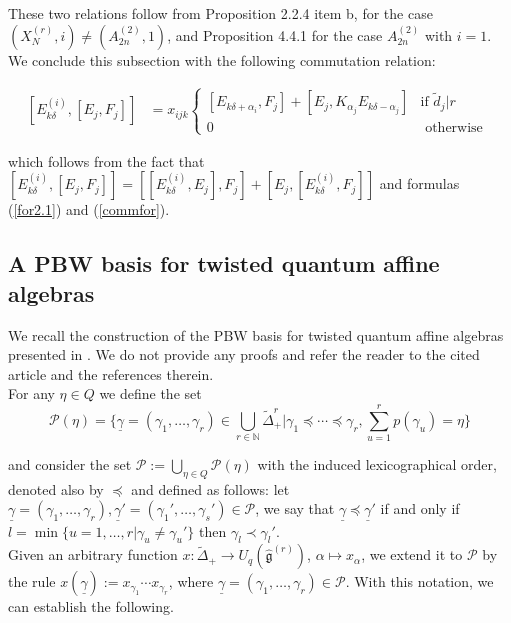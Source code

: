 \documentclass[12pt]{amsart}
\numberwithin{equation}{section}
\newcommand{\g}{\ensuremath{\mathfrak{g}}}
\newcommand{\mc}[1]{\mathcal{#1}}
\newcommand{\mb}[1]{\mathbb{#1}}
\begin{document}
These two relations follow from \cite{D} Proposition 2.2.4 item b, for the case $(X_N^{(r)}, i) \neq (A_{2n}^{(2)},1)$, and Proposition 4.4.1 for the case $A_{2n}^{(2)}$ with $i=1$. We conclude this subsection with the following commutation relation:

\begin{align}\label{for2.8}
    [E_{k\delta}^{(i)}, [E_j, F_j]] &=  x_{ijk}\begin{cases}
        [E_{k\delta + \alpha_i}, F_j] + [E_j, K_{\alpha_j}E_{k\delta-\alpha_j}] & \mbox{if } \tilde{d}_j|r\\
        0 & \mbox{ otherwise }
    \end{cases}
\end{align}

which follows from the fact that $[E_{k\delta}^{(i)}, [E_j, F_j]] = [[E_{k\delta}^{(i)}, E_j], F_j] + [E_j, [E_{k\delta}^{(i)}, F_j]]$ and formulas (\ref{for2.1}) and (\ref{commfor}).

\subsection{A PBW basis for twisted quantum affine algebras} 

We recall the construction of the PBW basis for twisted quantum affine algebras presented in \cite{D}. We do not provide any proofs and refer the reader to the cited article and the references therein.\\

For any $\eta \in Q$ we define the set 
$$\mc{P}(\eta) = \{\underline{\gamma} = (\gamma_1, \ldots, \gamma_r) \in \bigcup_{r\in \mb{N}} \tilde{\Delta}^r_{+} | \gamma_1 \preceq \cdots \preceq \gamma_r, \sum_{u=1}^{r} p(\gamma_u) = \eta \}$$ 

and consider the set $\mc{P} := \bigcup_{\eta \in Q} \mc{P}(\eta)$ with the induced lexicographical order, denoted also by $\preceq$ and defined as follows: let $\underline{\gamma} = (\gamma_1, \ldots, \gamma_r), \underline{\gamma}' = (\gamma_1', \ldots, \gamma_s') \in \mc{P}$, we say that $\underline{\gamma} \preceq \underline{\gamma}'$ if and only if $l = \min\{u= 1, \ldots, r | \gamma_u \neq \gamma_u'\}$ then $\gamma_l \prec \gamma_l'$.\\


Given an arbitrary function $x: \tilde{\Delta}_{+} \to U_q(\hat{\g}^{(r)})$, $\alpha\mapsto x_\alpha$, we extend it to $\mc{P}$ by the rule $x(\underline{\gamma}) := x_{\gamma_1}\cdots x_{\gamma_r}$, where $\underline{\gamma} = (\gamma_1, \ldots, \gamma_r) \in \mc{P}$. With this notation, we can establish the following.
\end{document}
